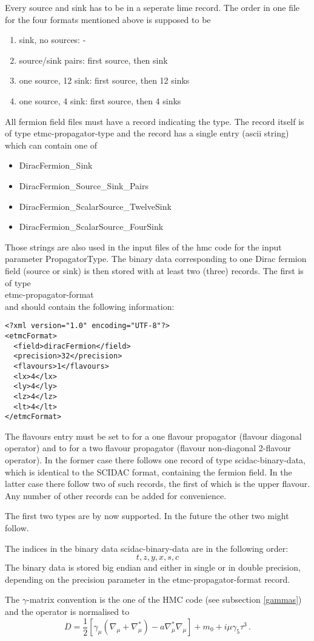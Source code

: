 Every source and sink has to be in a seperate lime record. The order
in one file for the four formats mentioned above is supposed to be 
\begin{enumerate}
\item sink, no sources: -
\item source/sink pairs: first source, then sink
\item one source, 12 sink: first source, then 12 sinks
\item one source, 4 sink: first source, then 4 sinks
\end{enumerate}
All fermion field files must have a record indicating the type. The
record itself is of type {\ttfamily etmc-propagator-type} and the
record has a single entry (ascii string) which can contain one of 
\begin{itemize}
\item {\ttfamily DiracFermion\_Sink}
\item {\ttfamily DiracFermion\_Source\_Sink\_Pairs}
\item {\ttfamily DiracFermion\_ScalarSource\_TwelveSink}
\item {\ttfamily DiracFermion\_ScalarSource\_FourSink}
\end{itemize}
Those strings are also used in the input files of the hmc code for the
input parameter {\ttfamily PropagatorType}.
The binary data corresponding to one Dirac fermion field (source or
sink) is then stored with at least two (three) records. The first is
of type \\
{\ttfamily etmc-propagator-format} \\
and should contain the following information:
\begin{verbatim}
<?xml version="1.0" encoding="UTF-8"?>
<etmcFormat>
  <field>diracFermion</field>
  <precision>32</precision>
  <flavours>1</flavours>
  <lx>4</lx>
  <ly>4</ly>
  <lz>4</lz>
  <lt>4</lt>
</etmcFormat>
\end{verbatim}
The {\ttfamily flavours} entry must be set to {} for a one
flavour propagator (flavour diagonal operator) and to {} for a two
flavour propagator (flavour non-diagonal 2-flavour operator). In the
former case there follows one record of type
{\ttfamily scidac-binary-data}, which is identical to the SCIDAC
format, containing the fermion field. In the latter case there follow
two of such records, the first of which is the upper flavour.
Any number of other records can be added for convenience.

The first two types are by now supported. In the future the other two
might follow.

The indices in the binary data {\ttfamily scidac-binary-data} are in
the following order:
\[
t, z, y, x, s, c
\]
The binary data is stored big endian and either in single or in double
precision, depending on the {\ttfamily precision} parameter in the
{\ttfamily etmc-propagator-format} record. 

The $\gamma$-matrix convention is the one of the HMC code (see
subsection \ref{gammas}) and the operator is normalised to
\[
D =
\frac{1}{2}[\gamma_\mu(\nabla_\mu+\nabla_\mu^*)-a\nabla_\mu^*\nabla_\mu]
+ m_0 + i \mu\gamma_5\tau^3\, .
\]


